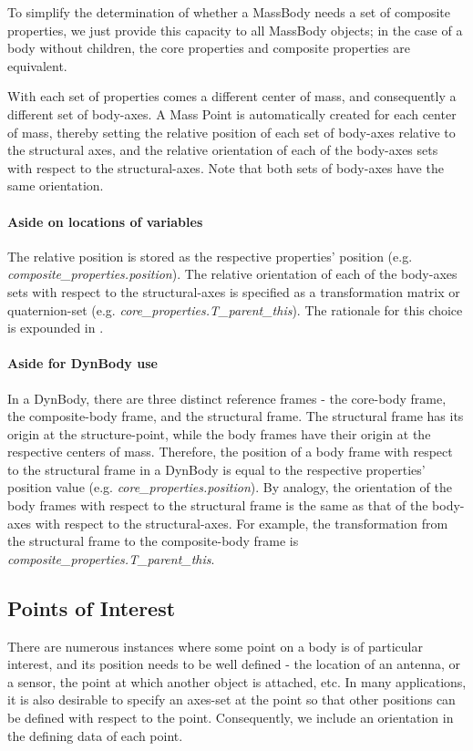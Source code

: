 To simplify the determination of whether a MassBody needs a set of composite
properties, we just provide this capacity to all MassBody objects; in the case
of a body without children, the core properties and composite properties are
equivalent.

With each set of properties comes a different center of mass, and consequently
a different set of body-axes.  A Mass Point is automatically created for each
center of mass, thereby setting
the relative position of each set of body-axes relative to the structural
axes, and the relative orientation of each of
the body-axes sets with respect to the structural-axes.  Note that both sets
of body-axes have the same orientation.

 \paragraph{Aside on locations of variables}
The relative position is stored as the respective properties' position (e.g.
\textit{composite\_properties.position}). The relative orientation of each of
the body-axes sets with respect to the structural-axes is specified as a
transformation matrix or quaternion-set (e.g.
\textit{core\_properties.T\_parent\_this}).  The rationale for this choice is
expounded in .

\paragraph{Aside for DynBody use}

In a DynBody, there are three distinct reference frames - the
core-body frame, the composite-body frame, and the structural frame.  The
structural frame has its origin at the structure-point, while the body frames
have their origin at the respective centers of mass.  Therefore, the position
of a body frame with respect to the structural frame in a DynBody is equal to
the respective properties' position value (e.g.
\textit{core\_properties.position}).  By analogy, the orientation of the body
frames with respect to the structural frame is the same as that of the
body-axes with respect to the structural-axes. For example, the transformation
from the structural frame to the composite-body frame is
\textit{composite\_properties.T\_parent\_this}.

\subsection{Points of Interest}\label{sec:MassPoint}
There are numerous instances where some point on a body is of particular
interest, and its position needs to be well defined - the location of an
antenna, or a sensor, the point at which another object is attached, etc.  In
many applications, it is also desirable to specify an axes-set at the point so
that other positions can be defined with respect to the point.  Consequently,
we include an orientation in the defining data of each point.

